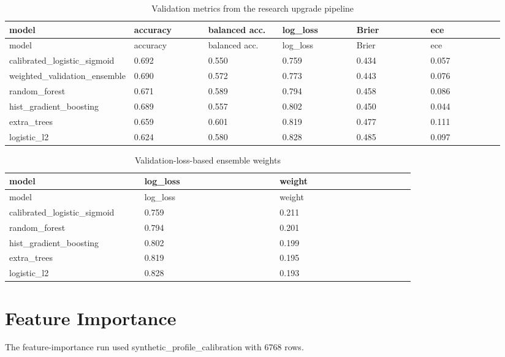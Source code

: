 \documentclass[10pt]{article}
\begin{document}
\begin{longtable}{p{0.157\linewidth}p{0.157\linewidth}p{0.157\linewidth}p{0.157\linewidth}p{0.157\linewidth}p{0.157\linewidth}}
\caption{Validation metrics from the research upgrade pipeline}\\
\toprule
model & accuracy & balanced acc. & log\_loss & Brier & ece \\
\midrule
\endfirsthead
\toprule
model & accuracy & balanced acc. & log\_loss & Brier & ece \\
\midrule
\endhead
calibrated\_logistic\_sigmoid & 0.692 & 0.550 & 0.759 & 0.434 & 0.057 \\
weighted\_validation\_ensemble & 0.690 & 0.572 & 0.773 & 0.443 & 0.076 \\
random\_forest & 0.671 & 0.589 & 0.794 & 0.458 & 0.086 \\
hist\_gradient\_boosting & 0.689 & 0.557 & 0.802 & 0.450 & 0.044 \\
extra\_trees & 0.659 & 0.601 & 0.819 & 0.477 & 0.111 \\
logistic\_l2 & 0.624 & 0.580 & 0.828 & 0.485 & 0.097 \\
\bottomrule
\end{longtable}


\begin{longtable}{p{0.280\linewidth}p{0.280\linewidth}p{0.280\linewidth}}
\caption{Validation-loss-based ensemble weights}\\
\toprule
model & log\_loss & weight \\
\midrule
\endfirsthead
\toprule
model & log\_loss & weight \\
\midrule
\endhead
calibrated\_logistic\_sigmoid & 0.759 & 0.211 \\
random\_forest & 0.794 & 0.201 \\
hist\_gradient\_boosting & 0.802 & 0.199 \\
extra\_trees & 0.819 & 0.195 \\
logistic\_l2 & 0.828 & 0.193 \\
\bottomrule
\end{longtable}


\section{Feature Importance}

The feature-importance run used synthetic\_profile\_calibration with 6768 rows.
\end{document}
